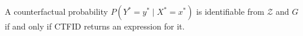 A counterfactual probability \(P(Y^{*}=y^{*}\mid X^{*}=x^{*})\) is identifiable from \(\mathcal Z\) and \(G\) if and only if CTFID returns an expression for it.